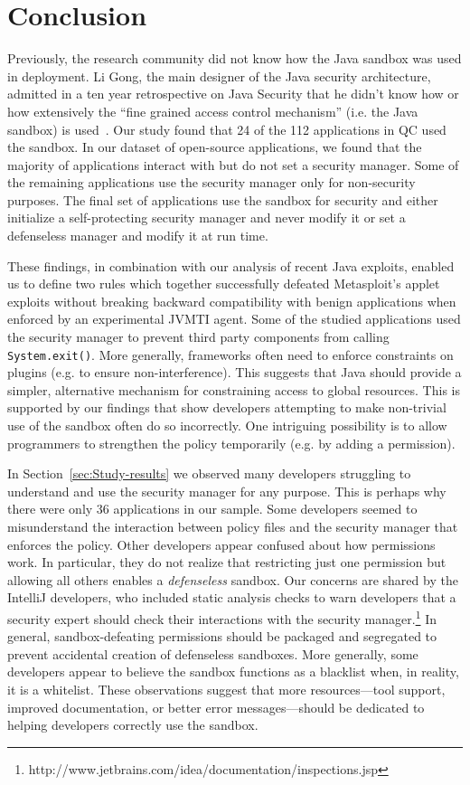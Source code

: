 \documentclass{sig-alternate}
\begin{document}
\section{Conclusion}\label{sec:Conclusion}
Previously, the research community did not know how the Java sandbox was
used in deployment. Li Gong, the main designer of the Java security architecture,
admitted in a ten year retrospective on Java Security that he didn't
know how or how extensively the ``fine grained access control mechanism''
(i.e. the Java sandbox) is used~\cite{gong2009java}.
Our study found that 24 of the 112 applications in QC used the sandbox.
In our dataset of open-source applications, we found
that the majority of applications interact with but do not set a security
manager. Some of the remaining applications use the security manager
only for non-security purposes. The final set of applications use
the sandbox for security and either initialize a self-protecting security
manager and never modify it or set a defenseless manager and modify
it at run time. 

These findings, in combination with our analysis of recent Java exploits,
enabled us to define two rules which together successfully
defeated Metasploit's applet exploits without breaking backward compatibility with benign applications when enforced by an experimental JVMTI agent. Some of the studied applications
used the security manager to prevent third party components from calling
\texttt{System.exit()}. More generally, frameworks often need to enforce
constraints on plugins (e.g. to ensure non-interference). This suggests
that Java should provide a simpler, alternative mechanism for constraining
access to global resources. This is supported by our findings that
show developers attempting to make non-trivial use of the sandbox
often do so incorrectly. One intriguing possibility is to allow programmers
to strengthen the policy temporarily (e.g. by adding a permission). 

In Section~\ref{sec:Study-results} we observed many developers struggling to understand and
use the security manager for any purpose. This is perhaps why there
were only 36 applications in our sample. Some developers seemed to
misunderstand the interaction between policy files and the security
manager that enforces the policy. Other developers appear confused
about how permissions work. In particular, they do not realize that
restricting just one permission but allowing all others enables a
\emph{defenseless} sandbox. Our concerns are shared by the IntelliJ developers, who included static analysis checks to warn developers that a security expert should check their interactions with the security manager.\footnote{http://www.jetbrains.com/idea/documentation/inspections.jsp%
} In general, sandbox-defeating permissions
should be packaged and segregated to prevent accidental creation of
defenseless sandboxes. More generally, some developers appear to believe
the sandbox functions as a blacklist when, in reality, it is a whitelist.
These observations suggest that more resources---tool support, improved
documentation, or better error messages---should be dedicated to helping
developers correctly use the sandbox. 



\end{document}
